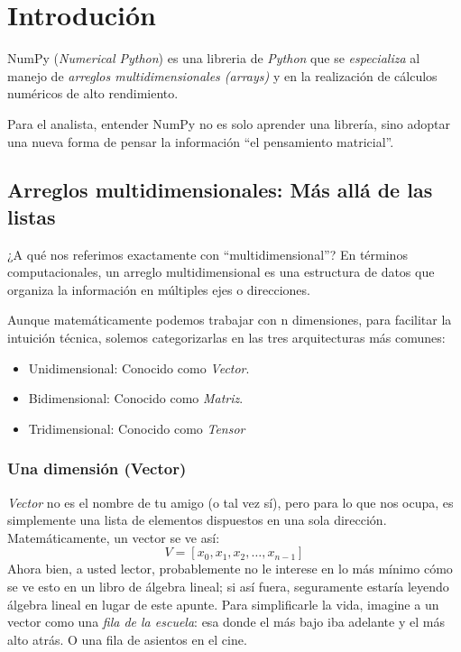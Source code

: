 \section{Introdución}

NumPy (\textit{Numerical Python}) es una libreria de \textit{Python} que se \textit{especializa} al manejo de \textit{arreglos multidimensionales (arrays)} y en la realización de cálculos numéricos de alto rendimiento.

Para el analista, entender NumPy no es solo aprender una librería, sino adoptar una nueva forma de pensar la información ``el pensamiento matricial''.

\subsection{Arreglos multidimensionales: Más allá de las listas}

¿A qué nos referimos exactamente con ``multidimensional''? En términos computacionales, un arreglo multidimensional es una estructura de datos que organiza la información en múltiples ejes o direcciones.

Aunque matemáticamente podemos trabajar con n dimensiones, para facilitar la intuición técnica, solemos categorizarlas en las tres arquitecturas más comunes:
\begin{itemize}
    \item Unidimensional: Conocido como \textit{Vector}.
    \item Bidimensional: Conocido como \textit{Matriz}.
    \item Tridimensional: Conocido como \textit{Tensor}
\end{itemize}


\subsubsection{Una dimensión (Vector)}

\textit{Vector} no es el nombre de tu amigo (o tal vez sí), pero para lo que nos ocupa, es simplemente una lista de elementos dispuestos en una sola dirección. Matemáticamente, un vector se ve así:
\[
V = \left[x_0,x_1,x_2,\dots,x_{n-1}\right]
\]
Ahora bien, a usted lector, probablemente no le interese en lo más mínimo cómo se ve esto en un libro de álgebra lineal; si así fuera, seguramente estaría leyendo álgebra lineal en lugar de este apunte. Para simplificarle la vida, imagine a un vector como una \textit{fila de la escuela}: esa donde el más bajo iba adelante y el más alto atrás. O una fila de asientos en el cine.

